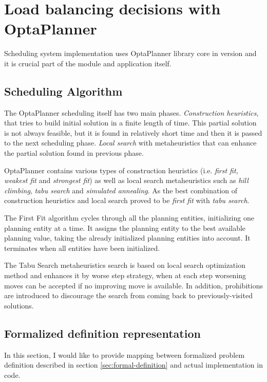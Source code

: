 \section{Load balancing decisions with OptaPlanner}\label{sec:load-balancing-optaplanner}

Scheduling system implementation uses OptaPlanner library core in version \cite{optaplannerDoc}
and it is crucial part of the  module and application itself.

\subsection{Scheduling Algorithm}
The OptaPlanner scheduling itself has two main phases.
\textit{Construction heuristics}, that tries to build initial solution in a finite length of time.
This partial solution is not always feasible, 
but it is found in relatively short time and then it is passed to the next scheduling phase.
\textit{Local search} with metaheuristics that can enhance the partial solution found in previous phase.

OptaPlanner contains various types of construction heuristics (i.e. \textit{first fit}, \textit{weakest fit} and \textit{strongest fit})
as well as local search metaheuristics such as \textit{hill climbing}, \textit{tabu search} and \textit{simulated annealing}.
As the best combination of construction heuristics and local search proved to be \textit{first fit} with \textit{tabu search}.

The First Fit algorithm cycles through all the planning entities,
initializing one planning entity at a time. 
It assigns the planning entity to the best available planning value, 
taking the already initialized planning entities into account.
It terminates when all entities have been initialized\cite{optaplannerDoc:heuristics}.

The Tabu Search metaheuristics search is based on local search optimization method
and enhances it by worse step strategy, 
when at each step worsening moves can be accepted if no improving move is available.
In addition, prohibitions are introduced to discourage the search from coming back to previously-visited solutions\cite{glover1989tabu}.

\subsection{Formalized definition representation}\label{subsec:formalized-definition-representation}
In this section,
I would like to provide mapping between formalized problem definition described in section \ref{sec:formal-definition}
and actual implementation in code.

